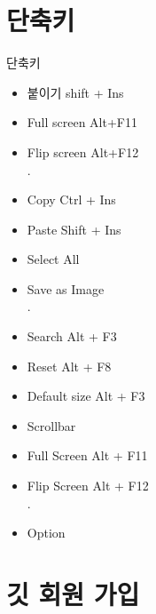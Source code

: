 \documentclass[aspectratio=1610,20pt,xcolor=pdftex,dvipsnames,table,handout]{beamer}
\begin{document}
		\section{단축키}

		\begin{frame} [t,plain]

			\begin{block} {단축키}
			\setlength{\leftmargini}{2em}			
			\begin{itemize}
				\item 붙이기 shift + Ins
				\item Full screen 	Alt+F11
				\item Flip screen 	Alt+F12 \\.
				\item Copy 	\hrulefill 	Ctrl + Ins
				\item Paste	\hrulefill 	Shift + Ins
				\item Select All \hrulefill 	
				\item Save as Image \hrulefill 	\\.

				\item Search	\hrulefill 	Alt + F3
				\item Reset	\hrulefill 	Alt + F8

				\item Default size	\hrulefill 	Alt + F3
				\item Scrollbar		\hrulefill 	
				\item Full Screen	\hrulefill 	Alt + F11
				\item Flip Screen	\hrulefill 	Alt + F12 \\ .

				\item Option		\hrulefill 	
			\end{itemize}
			\end{block}						

		\end{frame}			


		\section{깃  회원 가입}
\end{document}
